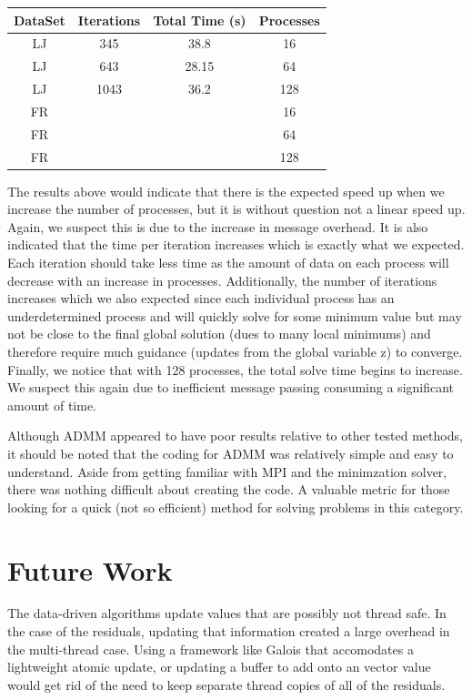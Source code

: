 \documentclass[letterpaper,11pt,onecolumn]{article}
\begin{document}
\begin{center}
  \begin{tabular}{c|c|c|c}
	\hline
	DataSet & Iterations & Total Time (s) & Processes \\
	\hline\hline
	LJ & 345 & 38.8  & 16 \\
	LJ & 643 & 28.15 & 64 \\
	LJ & 1043 & 36.2 & 128 \\
	FR &  &  & 16 \\
	FR &  &  & 64 \\
	FR &  &  & 128 \\
  \end{tabular}
\end{center}
The results above would indicate that there is the expected speed up when we increase the number of processes, but it is without question not a linear speed up. Again, we suspect this is due to the increase in message overhead. It is also indicated that the time per iteration increases which is exactly what we expected. Each iteration should take less time as the amount of data on each process will decrease with an increase in processes. Additionally, the number of iterations increases which we also expected since each individual process has an underdetermined process and will quickly solve for some minimum value but may not be close to the final global solution (dues to many local minimums) and therefore require much guidance (updates from the global variable z) to converge. Finally, we notice that with 128 processes, the total solve time begins to increase. We suspect this again due to inefficient message passing consuming a significant amount of time.


Although ADMM appeared to have poor results relative to other tested methods, it should be noted that the coding for ADMM was relatively simple and easy to understand. Aside from getting familiar with MPI and the minimzation solver, there was nothing difficult about creating the code. A valuable metric for those looking for a quick (not so efficient) method for solving problems in this category.

\section{Future Work}

The data-driven algorithms update values that are possibly not thread safe. In the case of the residuals, updating that information created a large overhead in the multi-thread case. Using a framework like Galois that accomodates a lightweight atomic update, or updating a buffer to add onto an vector value would get rid of the need to keep separate thread copies of all of the residuals. 
\end{document}
